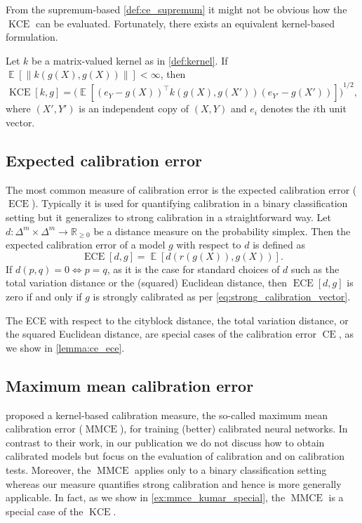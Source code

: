 \documentclass{article}
\DeclareMathOperator{\Expect}{\mathbb{E}}
\DeclareMathOperator{\ECE}{ECE}
\DeclareMathOperator{\measure}{CE}
\DeclareMathOperator{\kernelmeasure}{KCE}
\DeclareMathOperator{\MMCE}{MMCE}
\begin{document}
From the supremum-based \cref{def:ce_supremum} it might not be obvious how the
$\kernelmeasure$ can be evaluated. Fortunately, there exists an equivalent
kernel-based formulation.

\begin{lemma}
  Let $k$ be a matrix-valued kernel as in \cref{def:kernel}. If
  $\Expect[\|k(g(X),g(X))\|] < \infty$, then
  \begin{equation}\label{eq:ce2}
    \kernelmeasure[k,g] = {\bigg(\Expect[{(e_Y - g(X))}^{\intercal} k(g(X), g(X')) {(e_{Y'} - g(X'))}]\bigg)}^{1/2},
  \end{equation}
  where $(X', Y')$ is an independent copy of $(X,Y)$ and $e_i$ denotes the $i$th unit vector.
\end{lemma}

\subsection{Expected calibration error}

The most common measure of calibration error is the expected calibration error
($\ECE$). Typically it is used for quantifying calibration in a binary
classification setting but it generalizes to strong calibration in a
straightforward way. Let
$d \colon \Delta^m \times \Delta^m \to \mathbb{R}_{\geq 0}$ be a distance measure
on the probability simplex. Then the expected calibration error of a model $g$
with respect to $d$ is defined as
\begin{equation}\label{eq:ece_def}
  \ECE[d,g] = \Expect[d(r(g(X)), g(X))].
\end{equation}
If $d(p, q) = 0 \Leftrightarrow p = q$, as it is the case for standard choices
of $d$ such as the total variation distance or the (squared) Euclidean distance,
then $\ECE[d,g]$ is zero if and only if $g$ is strongly calibrated as per
\cref{eq:strong_calibration_vector}.

The ECE with respect to the cityblock distance, the total variation distance, or
the squared Euclidean distance, are special cases of the calibration error
$\measure$, as we show in \cref{lemma:ce_ece}.

\subsection{Maximum mean calibration error}

 proposed a kernel-based
calibration measure, the so-called maximum mean calibration error ($\MMCE$), for
training (better) calibrated neural networks. In contrast to their work, in our
publication we do not discuss how to obtain calibrated models but focus on the
evaluation of calibration and on calibration tests. Moreover, the $\MMCE$
applies only to a binary classification setting whereas our measure quantifies
strong calibration and hence is more generally applicable. In fact, as we show
in \cref{ex:mmce_kumar_special}, the $\MMCE$ is a special case of the
$\kernelmeasure$.
\end{document}
